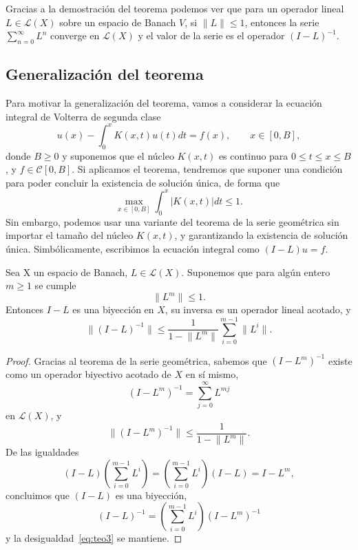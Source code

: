 \begin{observacion}
	Gracias a la demostración del teorema podemos ver que para un operador lineal $L \in \mathcal{L}(X)$ sobre un espacio de Banach $V$, si $\lVert L \rVert \leq 1$, entonces la serie $\sum_{n=0}^{\infty}L^n$ converge en $\mathcal{L}(X)$ y el valor de la serie es el operador $(I-L)^{-1}$.
\end{observacion}
\subsection{Generalización del teorema}
Para motivar la generalización del teorema, vamos a considerar la ecuación integral de Volterra de segunda clase
\begin{equation}
	u(x) - \int_{0}^{x} K(x,t)u(t)dt = f(x), \qquad x \in [0,B],
\end{equation}
donde $B \geq 0$ y suponemos que el núcleo $K(x,t)$ es continuo para $0 \leqslant t \leqslant x \leqslant B$, y $f \in \mathcal{C}[0,B]$. Si aplicamos el teorema, tendremos que suponer una condición para poder concluir la existencia de solución única, de forma que
\begin{equation}
	\max_{x\in [0,B]}\int_{0}^{x} |K(x,t)|dt \leq 1.
\end{equation}
Sin embargo, podemos usar una variante del teorema de la serie geométrica sin importar el tamaño del núcleo $K(x,t)$, y garantizando la existencia de solución única. Simbólicamente, escribimos la ecuación integral como $(I-L)u = f$.
\begin{corolario}
	Sea X un espacio de Banach, $L \in \mathcal{L}(X)$. Suponemos que para algún entero $m \geqslant 1$ se cumple
	\begin{equation}
		\lVert L^m \rVert \leq 1.
	\end{equation}
	Entonces $I - L$ es una biyección en $X$, su inversa es un operador lineal acotado, y 
	\begin{equation}\label{eq:teo3}
		\lVert (I-L)^{-1} \rVert \leqslant \dfrac{1}{1 - \lVert L^m \rVert} \sum_{i=0}^{m - 1}\lVert L^i \rVert.
	\end{equation}
\end{corolario}
\begin{proof}
	Gracias al teorema de la serie geométrica, sabemos que $(I-L^m)^{-1}$ existe como un operador biyectivo acotado de $X$ en sí mismo,
	\begin{equation}
		(I - L^m)^{-1} = \sum_{j=0}^{\infty}L^{mj} 
	\end{equation}
	en $\mathcal{L}(X)$, y
	\begin{equation}
		\lVert (I - L^m)^{-1} \rVert \leqslant \dfrac{1}{1 - \lVert L^m \rVert}.
	\end{equation}
	De las igualdades
	\begin{equation}
		(I - L)(\sum_{i=0}^{m - 1}L^i) = (\sum_{i=0}^{m - 1}L^i)(I-L) = I - L^m,
	\end{equation}
	concluimos que $(I-L)$ es una biyección,
	\begin{equation}
		(I-L)^{-1} = (\sum_{i=0}^{m-1}L^i)(I-L^m)^{-1}
	\end{equation}
	y la desigualdad~\eqref{eq:teo3} se mantiene.
\end{proof}
